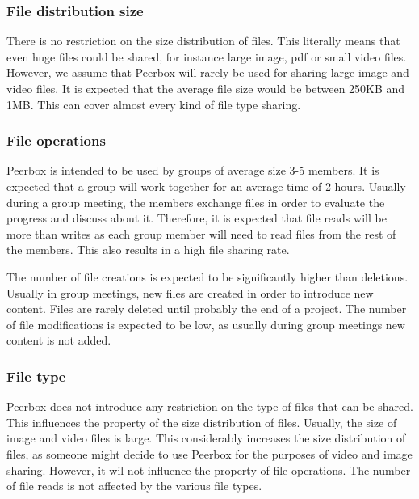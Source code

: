 \subsubsection{File distribution size}

There is no restriction on the size distribution of files. This literally means that even huge files could be shared, for instance large image, pdf or small video files. However, we assume that Peerbox will rarely be used for sharing large image and video files. It is expected that the average file size would be between 250KB and 1MB. This can cover almost every kind of file type sharing.

\subsubsection{File operations}

Peerbox is intended to be used by groups of average size 3-5 members. It is expected that a group will work together for an average time of 2 hours. Usually during a group meeting, the members exchange files in order to evaluate the progress and discuss about it. Therefore, it is expected that file reads will be more than writes as each group member will need to read files from the rest of the members. This also results in a high file sharing rate.

The number of file creations is expected to be significantly higher than deletions. Usually in group meetings, new files are created in order to introduce new content. Files are rarely deleted until probably the end of a project. The number of file modifications is expected to be low, as usually during group meetings new content is not added.

\subsubsection{File type}

Peerbox does not introduce any restriction on the type of files that can be shared. This influences the property of the size distribution of files. Usually, the size of image and video files is large. This considerably increases the size distribution of files, as someone might decide to use Peerbox for the purposes of video and image sharing. However, it wil not influence the property of file operations. The number of file reads is not affected by the various file types.
